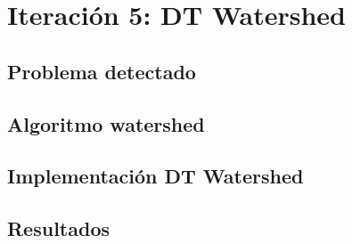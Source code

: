 \chapter{Iteración 5: DT Watershed}\label{dt_watershed}

\section{Problema detectado}\label{sec:dt_watershed_apex_problem}

\section{Algoritmo watershed}\label{sec:dt_watershed_watershed}

\section{Implementación DT Watershed}\label{sec:dt_watershed_implementation}

\section{Resultados}\label{sec:dt_watershed_resultados}
